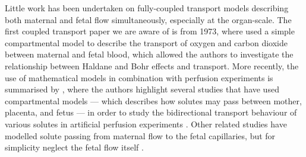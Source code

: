         Little work has been undertaken on fully-coupled transport models describing both maternal and fetal flow simultaneously, especially at the organ-scale. The first coupled transport paper we are aware of is from 1973, where \citeauthor{hillMathematicalModelCarbon1973} \cite{hillMathematicalModelCarbon1973} used a simple compartmental model to describe the transport of oxygen and carbon dioxide between maternal and fetal blood, which allowed the authors to investigate the relationship between Haldane and Bohr effects and transport. More recently, the use of mathematical models in combination with perfusion experiments is summarised by \citeauthor{lewisPlacentalPerfusionMathematical2020} \cite{lewisPlacentalPerfusionMathematical2020}, where the authors highlight several studies that have used compartmental models --- which describes how solutes may pass between mother, placenta, and fetus --- in order to study the bidirectional transport behaviour of various solutes in artificial perfusion experiments \cite{stirratTransferMetabolismCortisol2018,perazzoloInfluencePlacentalMetabolism2017,lofthouseComputationalModellingParacellular2023,hirschmuglPlacentalMobilizationFree2021}. Other related studies have modelled solute passing from maternal flow to the fetal capillaries, but for simplicity neglect the fetal flow itself \cite{perazzoloModellingEffectIntervillous2017}.

